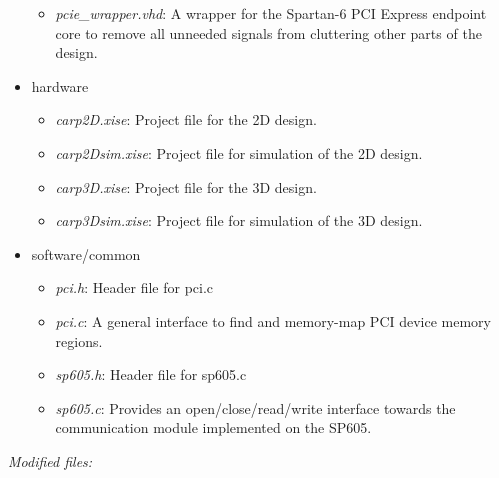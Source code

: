 \begin{itemize}
\begin{itemize}
        \item \emph{pcie\_wrapper.vhd}: A wrapper for the Spartan-6 PCI Express endpoint core to remove all unneeded signals from cluttering other parts of the design.
    \end{itemize}
    \item hardware
    \begin{itemize}
        \item \emph{carp2D.xise}: Project file for the 2D design.
        \item \emph{carp2Dsim.xise}: Project file for simulation of the 2D design.
        \item \emph{carp3D.xise}: Project file for the 3D design.
        \item \emph{carp3Dsim.xise}: Project file for simulation of the 3D design.
    \end{itemize}
    \item software/common
    \begin{itemize}
        \item \emph{pci.h}: Header file for pci.c
        \item \emph{pci.c}: A general interface to find and memory-map PCI device memory regions.
        \item \emph{sp605.h}: Header file for sp605.c
        \item \emph{sp605.c}: Provides an open/close/read/write interface towards the communication module implemented on the SP605.
    \end{itemize}
\end{itemize}

\emph{Modified files:}

